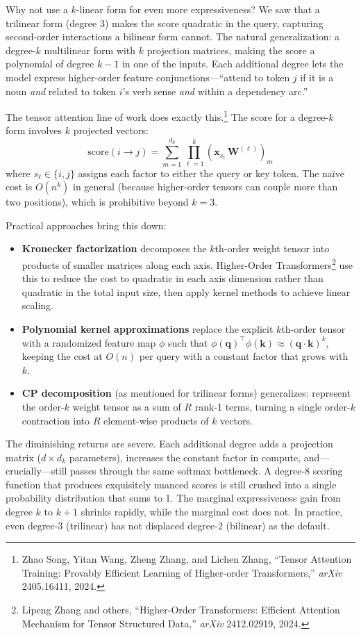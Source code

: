 \begin{whynotbox}{Why not use a $k$-linear form for even more expressiveness?}
We saw that a trilinear form (degree 3) makes the score quadratic in the query, capturing second-order interactions a bilinear form cannot. The natural generalization: a degree-$k$ multilinear form with $k$ projection matrices, making the score a polynomial of degree $k - 1$ in one of the inputs. Each additional degree lets the model express higher-order feature conjunctions---``attend to token $j$ if it is a noun \emph{and} related to token $i$'s verb sense \emph{and} within a dependency arc.''

The tensor attention line of work does exactly this.\footnote{Zhao Song, Yitan Wang, Zheng Zhang, and Lichen Zhang, ``Tensor Attention Training: Provably Efficient Learning of Higher-order Transformers,'' \emph{arXiv} 2405.16411, 2024.} The score for a degree-$k$ form involves $k$ projected vectors:
\[
\text{score}(i \to j) = \sum_{m=1}^{d_k} \prod_{\ell=1}^{k} (\mathbf{x}_{s_\ell}\, \mathbf{W}^{(\ell)})_m
\]
where $s_\ell \in \{i, j\}$ assigns each factor to either the query or key token. The na\"ive cost is $O(n^k)$ in general (because higher-order tensors can couple more than two positions), which is prohibitive beyond $k = 3$.

Practical approaches bring this down:
\begin{itemize}
  \item \textbf{Kronecker factorization} decomposes the $k$th-order weight tensor into products of smaller matrices along each axis. Higher-Order Transformers\footnote{Lipeng Zhang and others, ``Higher-Order Transformers: Efficient Attention Mechanism for Tensor Structured Data,'' \emph{arXiv} 2412.02919, 2024.} use this to reduce the cost to quadratic in each axis dimension rather than quadratic in the total input size, then apply kernel methods to achieve linear scaling.
  \item \textbf{Polynomial kernel approximations} replace the explicit $k$th-order tensor with a randomized feature map $\phi$ such that $\phi(\mathbf{q})^\top \phi(\mathbf{k}) \approx (\mathbf{q} \cdot \mathbf{k})^k$, keeping the cost at $O(n)$ per query with a constant factor that grows with $k$.
  \item \textbf{CP decomposition} (as mentioned for trilinear forms) generalizes: represent the order-$k$ weight tensor as a sum of $R$ rank-1 terms, turning a single order-$k$ contraction into $R$ element-wise products of $k$ vectors.
\end{itemize}

The diminishing returns are severe. Each additional degree adds a projection matrix ($d \times d_k$ parameters), increases the constant factor in compute, and---crucially---still passes through the same softmax bottleneck. A degree-8 scoring function that produces exquisitely nuanced scores is still crushed into a single probability distribution that sums to 1. The marginal expressiveness gain from degree $k$ to $k + 1$ shrinks rapidly, while the marginal cost does not. In practice, even degree-3 (trilinear) has not displaced degree-2 (bilinear) as the default.
\end{whynotbox}

